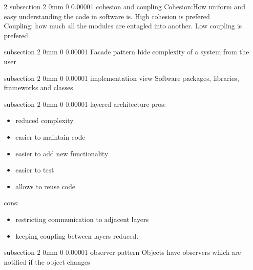 \documentclass[a4paper,11pt]{article}
\makeatletter
\renewcommand{\subsection}{\@startsection
   {subsection}%
   {2}%
   {0mm}%
   {0\baselineskip}%
   {0.00001\baselineskip}%
   {\rmfamily\normalfont\slshape\normalsize}}%
\makeatother
\begin{document}
\begin{multicols}{2}
 \subsection{cohesion and coupling}
 Cohesion:How uniform and easy understanding the code in software is. High cohesion is prefered
 \\Coupling: how much all the modules are entagled into another. Low coupling is prefered
 
 \subsection{Facade pattern}
hide complexity of a system from the user

\subsection{implementation view}
Software packages, libraries, frameworks and classes

\subsection{layered architecture}
pros:
\vspace{0 mm}
\begin{itemize}
 \setlength\itemsep{0em}
\item reduced complexity
\item easier to maintain code
\item easier to add new functionality
\item easier to test
\item allows to reuse code
\end{itemize}
cons:
\vspace{0 mm}
\begin{itemize}
 \setlength\itemsep{0em}
\item restricting communication to adjacent layers
\item keeping coupling between layers reduced.
\end{itemize}

\subsection{observer pattern}
Objects have observers which are notified if the object changes


\end{multicols}
\end{document}
